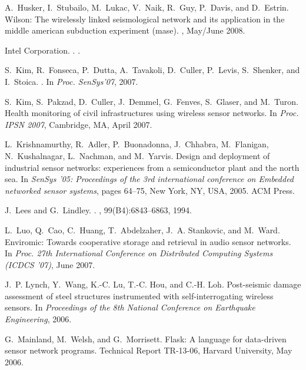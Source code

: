 \documentclass[lettersize]{sig-alternate-konrad}
\begin{document}
\begin{thebibliography}{10}
A.~Husker, I.~Stubailo, M.~Lukac, V.~Naik, R.~Guy, P.~Davis, and D.~Estrin.
\newblock Wilson: The wirelessly linked seismological network and its
  application in the middle american subduction experiment (mase).
, May/June 2008.

{Intel Corporation}.
.
.

S.~Kim, R.~Fonseca, P.~Dutta, A.~Tavakoli, D.~Culler, P.~Levis, S.~Shenker, and
  I.~Stoica.
.
\newblock In {\em Proc. SenSys'07}, 2007.

S.~Kim, S.~Pakzad, D.~Culler, J.~Demmel, G.~Fenves, S.~Glaser, and M.~Turon.
\newblock Health monitoring of civil infrastructures using wireless sensor
  networks.
\newblock In {\em Proc. IPSN 2007}, Cambridge, MA, April 2007.

L.~Krishnamurthy, R.~Adler, P.~Buonadonna, J.~Chhabra, M.~Flanigan,
  N.~Kushalnagar, L.~Nachman, and M.~Yarvis.
\newblock Design and deployment of industrial sensor networks: experiences from
  a semiconductor plant and the north sea.
\newblock In {\em SenSys '05: Proceedings of the 3rd international conference
  on Embedded networked sensor systems}, pages 64--75, New York, NY, USA, 2005.
  ACM Press.

J.~Lees and G.~Lindley.
.
, 99(B4):6843--6863, 1994.

L.~Luo, Q.~Cao, C.~Huang, T.~Abdelzaher, J.~A. Stankovic, and M.~Ward.
\newblock Enviromic: Towards cooperative storage and retrieval in audio sensor
  networks.
\newblock In {\em Proc. 27th International Conference on Distributed Computing
  Systems (ICDCS '07)}, June 2007.

J.~P. Lynch, Y.~Wang, K.-C. Lu, T.-C. Hou, and C.-H. Loh.
\newblock Post-seismic damage assessment of steel structures instrumented with
  self-interrogating wireless sensors.
\newblock In {\em Proceedings of the 8th National Conference on Earthquake
  Engineering}, 2006.

G.~Mainland, M.~Welsh, and G.~Morrisett.
\newblock Flask: A language for data-driven sensor network programs.
\newblock Technical Report TR-13-06, Harvard University, May 2006.


\end{thebibliography}
\end{document}
